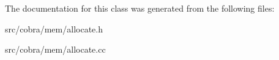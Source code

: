 The documentation for this class was generated from the following files\+:\begin{DoxyCompactItemize}
\item 
src/cobra/mem/allocate.\+h\item 
src/cobra/mem/allocate.\+cc\end{DoxyCompactItemize}

